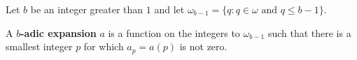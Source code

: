 Let $b$ be an integer greater than $1$ and let $\omega_{b-1} = \{q : q \in \omega \text{ and } q \leq b-1\}$.

A \textbf{$b$-adic expansion} $a$ is a function on the integers to $\omega_{b-1}$ such that there is a smallest integer $p$ for which $a_p = a(p)$ is not zero.
